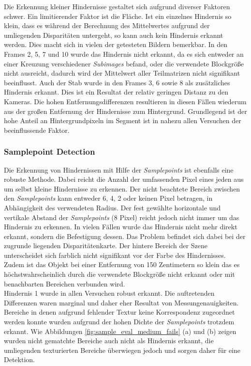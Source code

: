 \noindent
Die Erkennung kleiner Hindernisse gestaltet sich aufgrund diverser Faktoren schwer. Ein limitierender Faktor ist die Fläche. Ist ein einzelnes Hindernis so klein, dass es während der Berechnung des Mittelwertes aufgrund der umliegenden Disparitäten untergeht, so kann auch kein Hindernis erkannt werden. Dies macht sich in vielen der getesteten Bildern bemerkbar. In den Frames 2, 5, 7 und 10 wurde das Hindernis nicht erkannt, da es sich entweder an einer Kreuzung verschiedener \emph{Subimages} befand, oder die verwendete Blockgröße nicht ausreicht, dadurch wird der Mittelwert aller Teilmatrizen nicht signifikant beeinflusst. Auch der Stab wurde in den Frames 3, 6 sowie 8 als zusätzliches Hindernis erkannt. Dies ist ein Resultat der relativ geringen Distanz zu den Kameras. Die hohen Entfernungsdifferenzen resultieren in diesen Fällen wiederum aus der großen Entfernung der Hindernisse zum Hintergrund. Grundlegend ist der hohe Anteil an Hintergrundpixeln im Segment ist in nahezu allen Versuchen der beeinflussende Faktor.

\subsubsection{Samplepoint Detection}
\noindent
Die Erkennung von Hindernissen mit Hilfe der \emph{Samplepoints} ist ebenfalls eine robuste Methode. Dabei reicht die Anzahl der umfassenden Pixel eines jeden aus um selbst kleine Hindernisse zu erkennen. Der nicht beachtete Bereich zwischen den \emph{Samplepoints} kann entweder 6, 4, 2 oder keinen Pixel betragen, in Abhängigkeit des verwendeten Radius. Der fest gewählte horizontale und vertikale Abstand der \emph{Samplepoints} (8 Pixel) reicht jedoch nicht immer um das Hindernis zu erkennen. In vielen Fällen wurde das Hindernis nicht mehr direkt erkannt, sondern die Befestigung dessen. Das Problem befindet sich dabei bei der zugrunde liegenden Disparitätenkarte. Der hintere Bereich der Szene unterscheidet sich farblich nicht signifikant vor der Farbe des Hindernisses. Zudem ist das Objekt bei einer Entfernung von 150 Zentimetern so klein das es höchstwahrscheinlich durch die verwendete Blockgröße nicht erkannt oder mit benachbarten Bereichen verbunden wird.\\

\noindent
Hindernis 1 wurde in allen Versuchen robust erkannt. Die auftretenden Differenzen waren marginal und daher eher Resultat von Messungenauigkeiten. Bereiche in denen aufgrund fehlender Textur keine Korrespondenz zugeordnet werden konnte wurden aufgrund der hohen Dichte der \emph{Samplepoints} trotzdem erkannt. Wie Abbildungen \ref{fig:sample_eval_medium_fails} (a) und (b) zeigen wurden nicht gematchte Bereiche auch nicht als Hindernis erkannt, die umliegenden texturierten Bereiche überwiegen jedoch und sorgen daher für eine Detektion.

